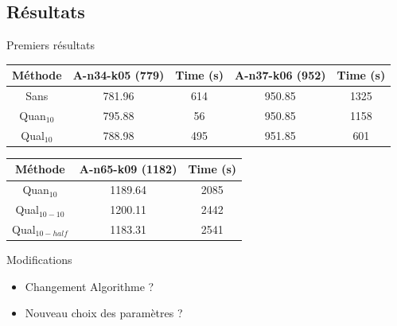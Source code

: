 \documentclass{beamer}
\begin{document}
\subsection{Résultats}

\begin{frame}{Premiers résultats}

\begin{tabular}{|c|c|c|c|c|}
   \hline
   Méthode  & A-n34-k05 (779) & Time (s) & A-n37-k06 (952) & Time (s) \\
   \hline
   Sans & 781.96  & 614 & 950.85 & 1325  \\
   \hline
   Quan$_{10}$ & 795.88 & 56 & 950.85 & 1158   \\
   \hline
   Qual$_{10}$ & 788.98 & 495 & 951.85 & 601  \\
   \hline
\end{tabular}

\begin{tabular}{|c|c|c|}
   \hline
   Méthode  & A-n65-k09 (1182) & Time (s) \\
   \hline
   Quan$_{10}$ & 1189.64 & 2085    \\
   \hline
   Qual$_{10-10}$ & 1200.11 & 2442   \\
   \hline
   Qual$_{10-half}$ & 1183.31 & 2541  \\
   \hline
\end{tabular}

\begin{block}{Modifications}
\begin{itemize}
\item Changement Algorithme ?
\item Nouveau choix des paramètres ?
\end{itemize}
\end{block}

\end{frame}
\end{document}
